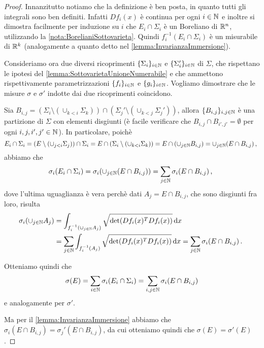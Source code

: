 \begin{proof}
	Innanzitutto notiamo che la definizione è ben posta, in quanto tutti gli integrali sono ben definiti. Infatti $Df_i(x)$ è continua per ogni $i\in\mathbb N$ e inoltre si dimostra facilmente per induzione su $i$ che $E_i\cap\Sigma_i$ è un Boreliano di $\mathbb R^n$, utilizzando la \cref{nota:BorelianiSottovarieta}. Quindi $f_i^{-1}(E_i\cap\Sigma_i)$ è un misurabile di $\mathbb R^k$ (analogamente a quanto detto nel \cref{lemma:InvarianzaImmersione}).

	Consideriamo ora due diversi ricoprimenti $\{\Sigma_i\}_{i\in\mathbb N}$ e $\{\Sigma_i'\}_{i\in\mathbb N}$ di $\Sigma$, che rispettano le ipotesi del \cref{lemma:SottovarietaUnioneNumerabile} e che ammettono rispettivamente parametrizzazioni $\{f_i\}_{i\in\mathbb N}$ e $\{g_i\}_{i\in\mathbb N}$. Vogliamo dimostrare che le misure $\sigma$ e $\sigma'$ indotte dai due ricoprimenti coincidono.
	
	Sia $B_{i,j}=(\Sigma_i\setminus (\cup_{k<i}\Sigma_k))\cap (\Sigma_j'\setminus (\cup_{k<j}\Sigma_j'))$, allora $\{B_{i,j}\}_{i,j\in\mathbb N}$ è una partizione di $\Sigma$ con elementi disgiunti (è facile verificare che $B_{i,j}\cap B_{i',j'}=\emptyset$ per ogni $i,j,i',j'\in\mathbb N$). In particolare, poichè
	\begin{equation*}
		E_i\cap\Sigma_i=(E\setminus (\cup_{j<i}\Sigma_j))\cap \Sigma_i=E\cap (\Sigma_i\setminus (\cup_{k<i}\Sigma_k))=E\cap (\cup_{j\in\mathbb N}B_{i,j})=\cup_{j\in\mathbb N}(E\cap B_{i,j})\, \text{, }
	\end{equation*}
	abbiamo che
	\begin{equation*}
		\sigma_i(E_i\cap \Sigma_i)=\sigma_i(\cup_{j\in\mathbb N}(E\cap B_{i,j}))=\sum_{j\in\mathbb N}\sigma_i(E\cap B_{i,j})\, \text{, }
	\end{equation*}
	dove l'ultima uguaglianza è vera perchè dati $A_j=E\cap B_{i,j}$, che sono disgiunti fra loro, risulta
	\begin{align*}
		\sigma_i(\cup_{j\in\mathbb N}A_j)& =\int_{f_i^{-1}(\cup_{j\in\mathbb N}A_j)}\sqrt{\det(Df_i(x)^TDf_i(x))} \,\mathrm d x\\
		&=\sum_{j\in\mathbb N}\int_{f_i^{-1}(A_j)}\sqrt{\det(Df_i(x)^TDf_i(x))} \,\mathrm d x=\sum_{j\in\mathbb N}\sigma_i(E\cap B_{i,j})\, \text{. }
	\end{align*}
	
	Otteniamo quindi che
	\begin{equation*}
		\sigma(E)=\sum_{i\in\mathbb N}\sigma_i(E_i\cap \Sigma_i)=\sum_{i,j\in\mathbb N} \sigma_i(E\cap B_{i,j})
	\end{equation*}
	e analogamente per $\sigma'$.

	Ma per il \cref{lemma:InvarianzaImmersione} abbiamo che $\sigma_i(E\cap B_{i,j})=\sigma_j'(E\cap B_{i,j})$, da cui otteniamo quindi che $\sigma(E)=\sigma'(E)$.

\end{proof}





